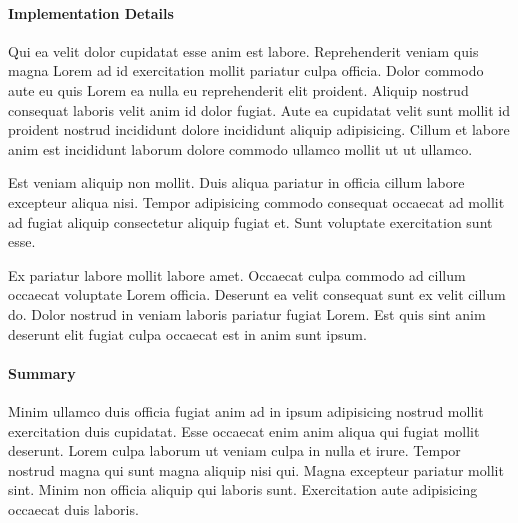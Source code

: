 \paragraph{Implementation Details}
Qui ea velit dolor cupidatat esse anim est labore. Reprehenderit veniam quis magna Lorem ad id exercitation mollit pariatur culpa officia. Dolor commodo aute eu quis Lorem ea nulla eu reprehenderit elit proident. Aliquip nostrud consequat laboris velit anim id dolor fugiat. Aute ea cupidatat velit sunt mollit id proident nostrud incididunt dolore incididunt aliquip adipisicing. Cillum et labore anim est incididunt laborum dolore commodo ullamco mollit ut ut ullamco.

Est veniam aliquip non mollit. Duis aliqua pariatur in officia cillum labore excepteur aliqua nisi. Tempor adipisicing commodo consequat occaecat ad mollit ad fugiat aliquip consectetur aliquip fugiat et. Sunt voluptate exercitation sunt esse.

Ex pariatur labore mollit labore amet. Occaecat culpa commodo ad cillum occaecat voluptate Lorem officia. Deserunt ea velit consequat sunt ex velit cillum do. Dolor nostrud in veniam laboris pariatur fugiat Lorem. Est quis sint anim deserunt elit fugiat culpa occaecat est in anim sunt ipsum.

\paragraph{Summary}
Minim ullamco duis officia fugiat anim ad in ipsum adipisicing nostrud mollit exercitation duis cupidatat. Esse occaecat enim anim aliqua qui fugiat mollit deserunt. Lorem culpa laborum ut veniam culpa in nulla et irure. Tempor nostrud magna qui sunt magna aliquip nisi qui. Magna excepteur pariatur mollit sint. Minim non officia aliquip qui laboris sunt. Exercitation aute adipisicing occaecat duis laboris.




